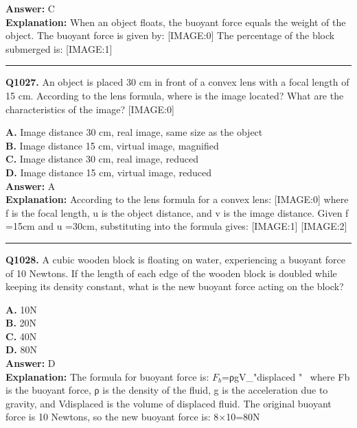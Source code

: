 \documentclass[12pt]{article}
\begin{document}
\textbf{Answer:} C \\
\textbf{Explanation:} When an object floats, the buoyant force equals the weight of the object. The buoyant force is given by:
[IMAGE:0]
The percentage of the block submerged is:
[IMAGE:1]

\hrule
\vspace{1em}


\noindent
\textbf{Q1027.} An object is placed 30 cm in front of a convex lens with a focal length of 15 cm. According to the lens formula, where is the image located? What are the characteristics of the image?
[IMAGE:0]



\textbf{A.} Image distance 30 cm, real image, same size as the object \\
\textbf{B.} Image distance 15 cm, virtual image, magnified \\
\textbf{C.} Image distance 30 cm, real image, reduced \\
\textbf{D.} Image distance 15 cm, virtual image, reduced \\

\textbf{Answer:} A \\
\textbf{Explanation:} According to the lens formula for a convex lens:
[IMAGE:0]
where
f
is the focal length,
u
is the object distance, and
v
is the image distance. Given
f
=15cm and
u
=30cm, substituting into the formula gives:
[IMAGE:1]
[IMAGE:2]

\hrule
\vspace{1em}


\noindent
\textbf{Q1028.} A cubic wooden block is floating on water, experiencing a buoyant force of 10 Newtons. If the length of each edge of the wooden block is doubled while keeping its density constant, what is the new buoyant force acting on the block?



\textbf{A.} 10N \\
\textbf{B.} 20N \\
\textbf{C.} 40N \\
\textbf{D.} 80N \\

\textbf{Answer:} D \\
\textbf{Explanation:} The formula for buoyant force is: $F_b$=ρgV_"displaced "  where Fb is the buoyant force, ρ is the density of the fluid, g is the acceleration due to gravity, and Vdisplaced is the volume of displaced fluid. The original buoyant force is 10 Newtons, so the new buoyant force is: 8×10=80N
\end{document}
